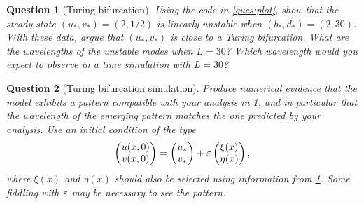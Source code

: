 \documentclass[a4paper]{siamart220329}
\theoremstyle{plain}
\newtheorem{question}{Question}
\begin{document}
\begin{question}[Turing bifurcation]\label{ques:Turing}
  Using the code in \cref{ques:plot}, show that the steady state $(u_*,v_*)
  = (2,1/2)$ is linearly unstable when $(b_*,d_*) = (2,30)$. With these data,
  argue that $(u_*,v_*)$ is close to a Turing bifurcation. What are the wavelengths
  of the unstable modes when $L=30$? Which wavelength would you expect to observe in a
  time simulation with $L=30$?
\end{question}

\begin{question}[Turing bifurcation simulation]\label{ques:TuringTimeStep}
Produce numerical evidence that the model exhibits a pattern compatible with your
analysis in \cref{ques:Turing}, and in particular that the wavelength of the emerging
pattern matches the one predicted by your analysis. Use an initial condition of the
type
\[
  \begin{pmatrix} u(x,0) \\ v(x,0) \end{pmatrix} = 
  \begin{pmatrix} u_* \\ v_* \end{pmatrix} +
  \varepsilon
  \begin{pmatrix} \xi(x) \\ \eta(x) \end{pmatrix},
\]
where $\xi(x)$ and $\eta(x)$ should also be selected using information from
\cref{ques:Turing}. Some fiddling with $\varepsilon$ may be necessary to see the pattern.

\end{question}



% 
% 
\end{document}
